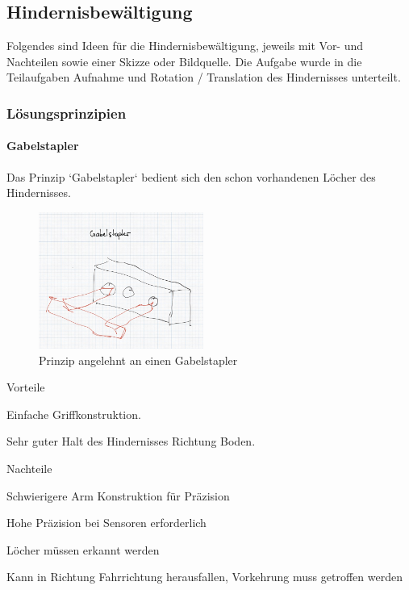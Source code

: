 \documentclass[../main.tex]{subfiles}
\begin{document}
\newpage
\subsection{Hindernisbewältigung}
Folgendes sind Ideen für die Hindernisbewältigung, jeweils mit Vor- und Nachteilen sowie einer Skizze oder Bildquelle. Die Aufgabe wurde in die Teilaufgaben Aufnahme und Rotation / Translation des Hindernisses unterteilt. 

\subsubsection{Lösungsprinzipien}
\paragraph{Gabelstapler}
Das Prinzip `Gabelstapler` bedient sich den schon vorhandenen Löcher des Hindernisses.

\begin{figure}[h!]
        \centering
        \includegraphics[width=0.48\textwidth]{img/technologierecherche/Aufnahme/Gabelstapler.jpg}
        \caption{Prinzip angelehnt an einen Gabelstapler}
        \label{img:tech_Gaplerstapler}
\end{figure}

\begin{minipage}[t]{0.48\textwidth}
    \begin{items}
          \item [Vorteile]
          \item Einfache Griffkonstruktion.
          \item Sehr guter Halt des Hindernisses Richtung Boden.
    \end{items}
\end{minipage}
\hfill
\begin{minipage}[t]{0.48\textwidth}
    \begin{items}
          \item [Nachteile]
          \item Schwierigere Arm Konstruktion für Präzision
          \item Hohe Präzision bei Sensoren erforderlich
          \item Löcher müssen erkannt werden
          \item Kann in Richtung Fahrrichtung herausfallen, Vorkehrung muss getroffen werden
    \end{items}
\end{minipage}
\newpage
\end{document}
